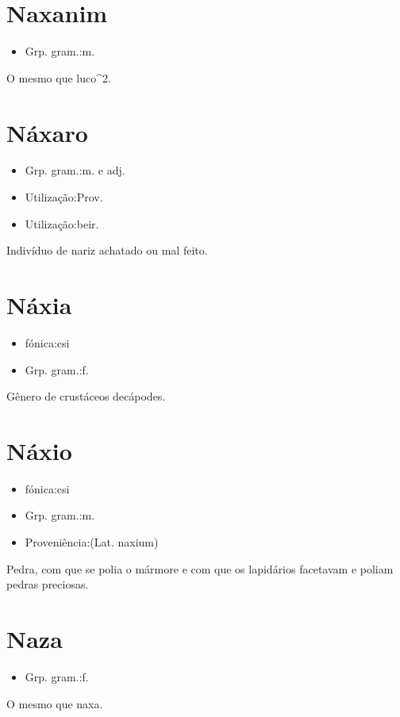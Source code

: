 \section{Naxanim}
\begin{itemize}
\item {Grp. gram.:m.}
\end{itemize}
O mesmo que \textunderscore luco\textunderscore ^2.
\section{Náxaro}
\begin{itemize}
\item {Grp. gram.:m.  e  adj.}
\end{itemize}
\begin{itemize}
\item {Utilização:Prov.}
\end{itemize}
\begin{itemize}
\item {Utilização:beir.}
\end{itemize}
Indivíduo de nariz achatado ou mal feito.
\section{Náxia}
\begin{itemize}
\item {fónica:csi}
\end{itemize}
\begin{itemize}
\item {Grp. gram.:f.}
\end{itemize}
Gênero de crustáceos decápodes.
\section{Náxio}
\begin{itemize}
\item {fónica:csi}
\end{itemize}
\begin{itemize}
\item {Grp. gram.:m.}
\end{itemize}
\begin{itemize}
\item {Proveniência:(Lat. \textunderscore naxium\textunderscore )}
\end{itemize}
Pedra, com que se polia o mármore e com que os lapidários facetavam e poliam pedras preciosas.
\section{Naza}
\begin{itemize}
\item {Grp. gram.:f.}
\end{itemize}
O mesmo que \textunderscore naxa\textunderscore .
